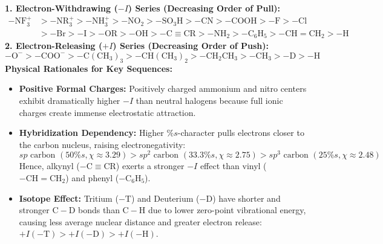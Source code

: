 \documentclass[10pt,a4paper]{article}
\begin{document}
\begin{formulabox}
\textbf{1. Electron-Withdrawing ($-I$) Series (Decreasing Order of Pull):}
\begin{equation}
  \begin{aligned}
    -\mathrm{NF_3^+} &> -\mathrm{NR_3^+} > -\mathrm{NH_3^+} > -\mathrm{NO_2} > -\mathrm{SO_3H} > -\mathrm{CN} > -\mathrm{COOH} > -\mathrm{F} > -\mathrm{Cl} \\
    &> -\mathrm{Br} > -\mathrm{I} > -\mathrm{OR} > -\mathrm{OH} > -\mathrm{C\equiv CR} > -\mathrm{NH_2} > -\mathrm{C_6H_5} > -\mathrm{CH=CH_2} > -\mathrm{H}
  \end{aligned}
\end{equation}
\textbf{2. Electron-Releasing ($+I$) Series (Decreasing Order of Push):}
\begin{equation}
  -\mathrm{O^-} > -\mathrm{COO^-} > -\mathrm{C(CH_3)_3} > -\mathrm{CH(CH_3)_2} > -\mathrm{CH_2CH_3} > -\mathrm{CH_3} > -\mathrm{D} > -\mathrm{H}
\end{equation}
\textbf{Physical Rationales for Key Sequences:}
\begin{itemize}
  \item \textbf{Positive Formal Charges:} Positively charged ammonium and nitro centers exhibit dramatically higher $-I$ than neutral halogens because full ionic charges create immense electrostatic attraction.
  \item \textbf{Hybridization Dependency:} Higher $\% s$-character pulls electrons closer to the carbon nucleus, raising electronegativity:
  \begin{equation}
    sp\text{ carbon } (50\% s, \chi \approx 3.29) > sp^2\text{ carbon } (33.3\% s, \chi \approx 2.75) > sp^3\text{ carbon } (25\% s, \chi \approx 2.48)
  \end{equation}
  Hence, alkynyl ($-\mathrm{C\equiv CR}$) exerts a stronger $-I$ effect than vinyl ($-\mathrm{CH=CH_2}$) and phenyl ($-\mathrm{C_6H_5}$).
  \item \textbf{Isotope Effect:} Tritium ($-\mathrm{T}$) and Deuterium ($-\mathrm{D}$) have shorter and stronger $\mathrm{C-D}$ bonds than $\mathrm{C-H}$ due to lower zero-point vibrational energy, causing less average nuclear distance and greater electron release: $+I(\mathrm{-T}) > +I(\mathrm{-D}) > +I(\mathrm{-H})$.
\end{itemize}
\end{formulabox}
\end{document}
